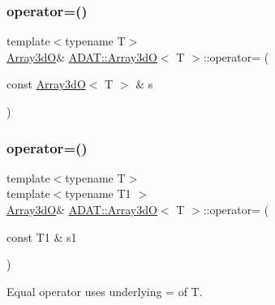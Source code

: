 \mbox{\label{classADAT_1_1Array3dO_a11d4d9d221d7e6598675307926a38f4f}} 
\subsubsection{\texorpdfstring{operator=()}{operator=()}\hspace{0.1cm}{\footnotesize\ttfamily [3/6]}}
{\footnotesize\ttfamily template$<$typename T$>$ \\
\mbox{\hyperlink{classADAT_1_1Array3dO}{Array3dO}}\& \mbox{\hyperlink{classADAT_1_1Array3dO}{A\+D\+A\+T\+::\+Array3dO}}$<$ T $>$\+::operator= (\begin{DoxyParamCaption}\item[{const \mbox{\hyperlink{classADAT_1_1Array3dO}{Array3dO}}$<$ T $>$ \&}]{s }\end{DoxyParamCaption})\hspace{0.3cm}{\ttfamily [inline]}}

\mbox{\label{classADAT_1_1Array3dO_a7f1b73e1e34cf1e21dfac8af86469ee1}} 
\subsubsection{\texorpdfstring{operator=()}{operator=()}\hspace{0.1cm}{\footnotesize\ttfamily [4/6]}}
{\footnotesize\ttfamily template$<$typename T$>$ \\
template$<$typename T1 $>$ \\
\mbox{\hyperlink{classADAT_1_1Array3dO}{Array3dO}}\& \mbox{\hyperlink{classADAT_1_1Array3dO}{A\+D\+A\+T\+::\+Array3dO}}$<$ T $>$\+::operator= (\begin{DoxyParamCaption}\item[{const T1 \&}]{s1 }\end{DoxyParamCaption})\hspace{0.3cm}{\ttfamily [inline]}}



Equal operator uses underlying = of T. 

\mbox{\label{classADAT_1_1Array3dO_a7f1b73e1e34cf1e21dfac8af86469ee1}} 
